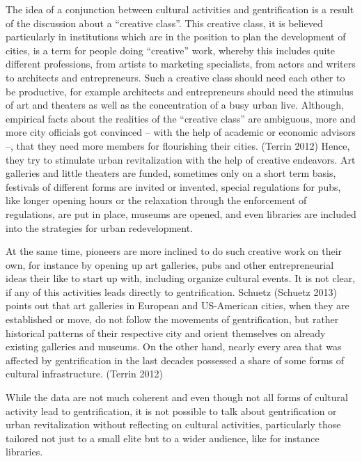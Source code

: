 \documentclass[a4paper,
fontsize=11pt,
oneside,
numbers=noperiodatend,
parskip=half-,
bibliography=totoc,
final
]{scrartcl}
\begin{document}
The idea of a conjunction between cultural activities and gentrification
is a result of the discussion about a \enquote{creative class}. This
creative class, it is believed particularly in institutions which are in
the position to plan the development of cities, is a term for people
doing \enquote{creative} work, whereby this includes quite different
professions, from artists to marketing specialists, from actors and
writers to architects and entrepreneurs. Such a creative class should
need each other to be productive, for example architects and
entrepreneurs should need the stimulus of art and theaters as well as
the concentration of a busy urban live. Although, empirical facts about
the realities of the \enquote{creative class} are ambiguous, more and
more city officials got convinced -- with the help of academic or
economic advisors --, that they need more members for flourishing their
cities. (Terrin 2012) Hence, they try to stimulate urban revitalization
with the help of creative endeavors. Art galleries and little theaters
are funded, sometimes only on a short term basis, festivals of different
forms are invited or invented, special regulations for pubs, like longer
opening hours or the relaxation through the enforcement of regulations,
are put in place, museums are opened, and even libraries are included
into the strategies for urban redevelopment.

At the same time, pioneers are more inclined to do such creative work on
their own, for instance by opening up art galleries, pubs and other
entrepreneurial ideas their like to start up with, including organize
cultural events. It is not clear, if any of this activities leads
directly to gentrification. Schuetz (Schuetz 2013) points out that art
galleries in European and US-American cities, when they are established
or move, do not follow the movements of gentrification, but rather
historical patterns of their respective city and orient themselves on
already existing galleries and museums. On the other hand, nearly every
area that was affected by gentrification in the last decades possessed a
share of some forms of cultural infrastructure. (Terrin 2012)

While the data are not much coherent and even though not all forms of
cultural activity lead to gentrification, it is not possible to talk
about gentrification or urban revitalization without reflecting on
cultural activities, particularly those tailored not just to a small
elite but to a wider audience, like for instance libraries.
\end{document}
